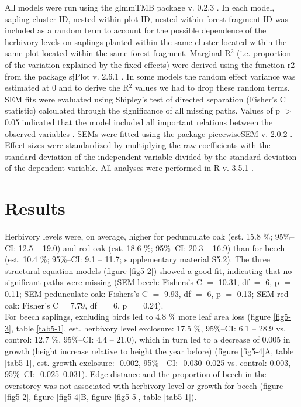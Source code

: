 \documentclass[10pt, twoside]{book} %
\begin{document}
		All models were run using the glmmTMB package v. 0.2.3 \citep{Brooks2017}. In each model, sapling cluster ID, nested within plot ID, nested within forest fragment ID was included as a random term to account for the possible dependence of the herbivory levels on saplings planted within the same cluster located within the same plot located within the same forest fragment. Marginal R$^2$ (i.e. proportion of the variation explained by the fixed effects) were derived using the function r2 from the package sjPlot v. 2.6.1 \citep{Ludecke2018}. In some models the random effect variance was estimated at 0 and to derive the R$^2$ values we had to drop these random terms. SEM fits were evaluated using Shipley's test of directed separation (Fisher's C statistic) calculated through the significance of all missing paths. Values of p $>$ 0.05 indicated that the model included all important relations between the observed variables \citep{Shipley2009}. SEMs were fitted using the package piecewiseSEM v. 2.0.2 \citep{Lefcheck2016}. Effect sizes were standardized by multiplying the raw coefficients with the standard deviation of the independent variable divided by the standard deviation of the dependent variable. All analyses were performed in R v. 3.5.1 \citep{RCoreTeam2018}.\\
\clearpage	
	\section{Results}
	
	Herbivory levels were, on average, higher for pedunculate oak (est. 15.8 \%; 95\%--CI: 12.5 -- 19.0) and red oak (est. 18.6 \%; 95\%--CI: 20.3 -- 16.9) than for beech (est. 10.4 \%; 95\%--CI: 9.1 -- 11.7; supplementary material S5.2). The three structural equation models (figure \ref{fig5-2}) showed a good fit, indicating that no significant paths were missing (SEM beech: Fishers's C $=$ 10.31, df $=$ 6, p $=$ 0.11; SEM pedunculate oak: Fishers's C $=$ 9.93, df $=$ 6, p $=$ 0.13; SEM red oak: Fisher's C = 7.79, df $=$ 6, p $=$ 0.24).\\
	
	For beech saplings, excluding birds led to 4.8 \% more leaf area loss (figure \ref{fig5-3}, table \ref{tab5-1}, est. herbivory level exclosure: 17.5 \%, 95\%--CI: 6.1 -- 28.9 vs. control: 12.7 \%, 95\%--CI: 4.4 -- 21.0), which in turn led to a decrease of 0.005 in growth (height increase relative to height the year before) (figure \ref{fig5-4}A, table \ref{tab5-1}, est. growth exclosure: -0.002, 95\%---CI: -0.030--0.025 vs. control: 0.003, 95\%--CI: -0.025--0.031). Edge distance and the proportion of beech in the overstorey was not associated with herbivory level or growth for beech (figure \ref{fig5-2}, figure \ref{fig5-4}B, figure \ref{fig5-5}, table \ref{tab5-1}).\\
	
\end{document}
